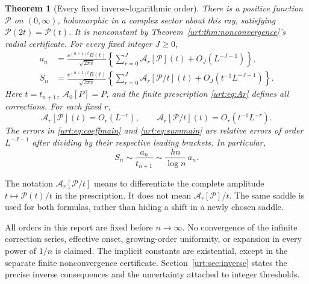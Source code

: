 \documentclass[11pt,letterpaper]{article}
\newtheorem{theorem}{Theorem}[section]
\theoremstyle{remark}\newtheorem{remark}[theorem]{Remark}
\newcommand{\Pc}{\mathcal P}\newcommand{\Bc}{\mathcal B}\newcommand{\dd}{\mathrm d}
\begin{document}
\begin{theorem}[Every fixed inverse-logarithmic order]\label{urt:thm:expansion}
There is a positive function $\Pc$ on $(0,\infty)$, holomorphic in a complex sector about this ray, satisfying $\Pc(2t)=\Pc(t)$. It is nonconstant by Theorem~\ref{urt:thm:nonconvergence}'s radial certificate. For every fixed integer $J\ge0$,
\begin{align}
 a_n&=\frac{\ee^{(n+1)t}B(t)}{\sqrt{2\pi v}}
   \left\{\sum_{r=0}^J\mathcal A_r[\Pc](t)+O_J(L^{-J-1})\right\},\label{urt:eq:coeffmain}\\
 S_n&=\frac{\ee^{(n+1)t}B(t)}{\sqrt{2\pi v}}
   \left\{\sum_{r=0}^J\mathcal A_r[\Pc/t](t)+O_J(t^{-1}L^{-J-1})\right\}.
 \label{urt:eq:summain}
\end{align}
Here $t=t_{n+1}$, $\mathcal A_0[P]=P$, and the finite prescription \eqref{urt:eq:Ar} defines all corrections. For each fixed $r$,
\[
 \mathcal A_r[\Pc](t)=O_r(L^{-r}),\qquad
 \mathcal A_r[\Pc/t](t)=O_r(t^{-1}L^{-r}).
\]
The errors in \eqref{urt:eq:coeffmain} and \eqref{urt:eq:summain} are relative errors of order $L^{-J-1}$ after dividing by their respective leading brackets. In particular,
\begin{equation}\label{urt:eq:sumleading}
 S_n\sim\frac{a_n}{t_{n+1}}\sim\frac{hn}{\log n}\,a_n.
\end{equation}
\end{theorem}
The notation $\mathcal A_r[\Pc/t]$ means to differentiate the complete amplitude $t\mapsto\Pc(t)/t$ in the prescription. It does not mean $\mathcal A_r[\Pc]/t$. The same saddle is used for both formulas, rather than hiding a shift in a newly chosen saddle.

All orders in this report are fixed before $n\to\infty$. No convergence of the infinite correction series, effective onset, growing-order uniformity, or expansion in every power of $1/n$ is claimed. The implicit constants are existential, except in the separate finite nonconvergence certificate. Section~\ref{urt:sec:inverse} states the precise inverse consequences and the uncertainty attached to integer thresholds.
\end{document}
